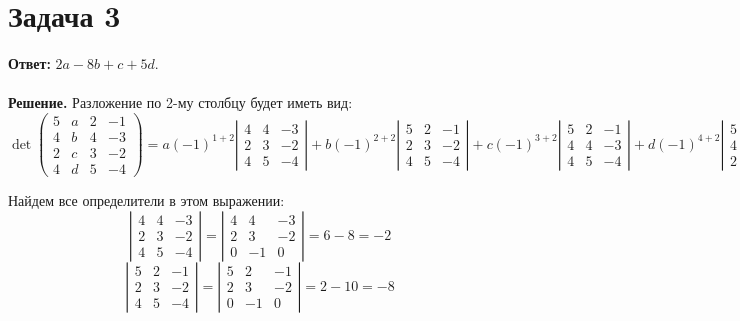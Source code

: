 \documentclass{article}
\begin{document}
\section*{Задача 3}
{\bf Ответ:} $2a-8b+c+5d$.
\\
\\
{\bf Решение.} Разложение по 2-му столбцу будет иметь вид:
$$\det\left(\begin{array}{rrrr}5 & a & 2 & -1\\4 & b & 4 & -3\\2 & c & 3 & -2\\4 & d & 5 & -4 \end{array}\right)=a(-1)^{1+2}\left|\begin{array}{rrr}4 & 4 & -3\\2 & 3 & -2\\4 & 5 & -4\end{array}\right|+b(-1)^{2+2}\left|\begin{array}{rrr}5 & 2 & -1\\2 & 3 & -2\\4 & 5 & -4\end{array}\right|+c(-1)^{3+2}\left|\begin{array}{rrr}5 & 2 & -1\\4 & 4 & -3\\4 & 5 & -4\end{array}\right|+d(-1)^{4+2}\left|\begin{array}{rrr}5 & 2 & -1\\4 & 4 & -3\\2 & 3 & 
-2\end{array}\right|$$
\par
Найдем все определители в этом выражении:
$$\left|\begin{array}{rrr}4 & 4 & -3\\2 & 3 & -2\\4 & 5 & -4\end{array}\right|=\left|\begin{array}{rrr}4 & 4 & -3\\2 & 3 & -2\\0 & -1 & 0\end{array}\right|=6-8=-2$$
$$\left|\begin{array}{rrr}5 & 2 & -1\\2 & 3 & -2\\4 & 5 & -4\end{array}\right|=\left|\begin{array}{rrr}5 & 2 & -1\\2 & 3 & -2\\0 & -1 & 0\end{array}\right|=2-10=-8$$
\end{document}
